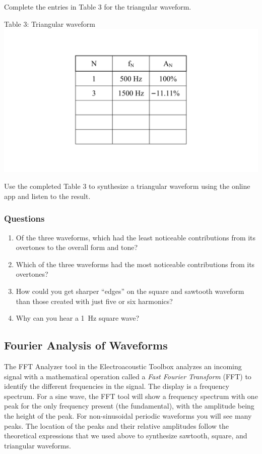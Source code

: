 \documentclass[11pt]{NSF}
\def\ben{\begin{enumerate}}
\def\een{\end{enumerate}}
\def\i{\item{}}
\begin{document}
Complete the entries in Table 3 for the triangular waveform.
%
\begin{table}[hbtp]
\begin{center}
Table 3: Triangular waveform\\
\includegraphics[width=.35\textwidth]{tab5_3}
\label{t:3}
\end{center}
\end{table}
%

Use the completed Table 3 to synthesize a triangular 
waveform using the online app and listen to the result.

\subsubsection*{Questions}
\ben
\i Of the three waveforms, which had the least noticeable 
contributions from its overtones to the overall form and tone?

\i Which of the three waveforms had the most 
noticeable contributions from its overtones?

\i How could you get sharper ``edges” on the square and 
sawtooth waveform than those created with just five or six
harmonics?

\i Why can you hear a 1~Hz square wave?
\een

\subsection{Fourier Analysis of Waveforms}

The FFT Analyzer tool in the Electroacoustic Toolbox 
analyzes an incoming signal with a mathematical operation 
called a {\em Fast Fourier Transform} (FFT) to 
identify the different frequencies in the signal. 
The display is a frequency spectrum.
For a sine wave, the FFT tool will show a frequency spectrum with one peak for
the only frequency present (the fundamental), 
with the amplitude being the height of the peak.
For non-sinusoidal periodic waveforms you will see many peaks.
The location of the peaks and their relative amplitudes 
follow the theoretical expressions that we used above to synthesize
sawtooth, square, and triangular waveforms.
\end{document}
